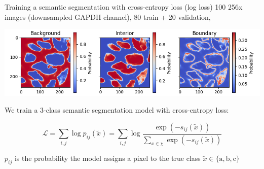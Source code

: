 \documentclass[aspectratio=1610]{beamer}					%
\begin{document}
\begin{frame}{Training a semantic segmentation with cross-entropy loss (log loss)}
\vspace{0.1in}
100 256\;x images (downsampled GAPDH channel), 80 train + 20 validation, 

\begin{center}
\includegraphics[width=1\textwidth]{Softmax.png}
\end{center}

We train a 3-class semantic segmentation model with cross-entropy loss:

\begin{equation*}
\mathcal{L} = \sum_{i,j} \log p_{ij}(\tilde{x}) = \sum_{i,j} \log \frac{\exp(-s_{ij}(\tilde{x}))}{\sum_{x\in\chi} \exp(-s_{ij}(\tilde{x}))}
\end{equation*}

$p_{ij}$ is the probability the model assigns a pixel to the true class $\tilde{x} \in \{\textrm{a}, \textrm{b}, \textrm{c}\}$

\end{frame}
\end{document}
